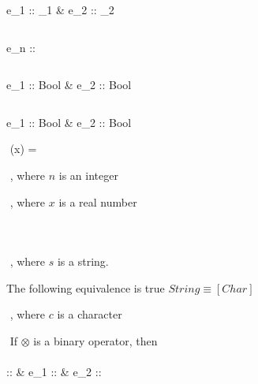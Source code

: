 \documentclass[12pt]{article}
\begin{document}
      {\Gamma \vdash e_1 :: \tau_1 & \Gamma \vdash e_2 :: \tau_2}

$ $\newline 

      {\Gamma \vdash e_n :: \tau}

$ $\newline 

      {\Gamma \vdash e_1 :: Bool & \Gamma \vdash e_2 :: Bool}

$ $\newline 

    {\Gamma \vdash e_1 :: Bool & \Gamma \vdash e_2 :: Bool}
      
$ $\newline
{}
      {\Gamma(x) = \tau}  


$ $\newline
{}
      {}
,\,\,where $n$ is an integer


$ $\newline
{}
    {}  
    ,\,\,where $x$ is a real number

$ $\newline
{}
      {}

$ $\newline
{}
      {}

$ $\newline
{}
    {}

$ $\newline
{}
      {}
,\,\,where $s$ is a string.

The following equivalence is true $String \equiv [Char]$

$ $\newline
{}
      {}
,\,\,where $c$ is a character

$ $\newline
If $\otimes$ is a binary operator, then\\\\
      {\Gamma \vdash \otimes :: \alpha \shortrightarrow \beta \shortrightarrow \tau 
      & \Gamma \vdash e_1 :: \alpha & \Gamma \vdash e_2 :: \beta}
\end{document}
